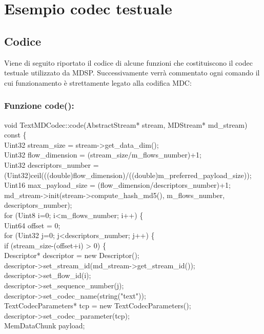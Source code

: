 \chapter{Esempio codec testuale}
\section{Codice}
Viene di seguito riportato il codice di alcune funzioni che costituiscono il codec testuale utilizzato da MDSP. Successivamente verr\`a commentato ogni comando il cui funzionamento \`e strettamente legato alla codifica MDC:
\subsection{Funzione code():}

\begin{code}
void TextMDCodec::code(AbstractStream* stream, MDStream* md\_stream) const \{\\
	Uint32 stream\_size = stream->get\_data\_dim();\\
	Uint32 flow\_dimension = (stream\_size/m\_flows\_number)+1;\\
	Uint32 descriptors\_number = \\(Uint32)ceil(((double)flow\_dimension)/((double)m\_preferred\_payload\_size));\\
	Uint16 max\_payload\_size = (flow\_dimension/descriptors\_number)+1;\\
	md\_stream->init(stream->compute\_hash\_md5(), m\_flows\_number, descriptors\_number);\\
	for (Uint8 i=0; i<m\_flows\_number; i++) \{\\
		Uint64 offset = 0;\\
		for (Uint32 j=0; j<descriptors\_number; j++) \{\\
			if (stream\_size-(offset+i) > 0) \{\\
				Descriptor* descriptor = new Descriptor();\\
				descriptor->set\_stream\_id(md\_stream->get\_stream\_id());\\
				descriptor->set\_flow\_id(i);\\
				descriptor->set\_sequence\_number(j);\\
				descriptor->set\_codec\_name(string("text"));\\
				TextCodecParameters* tcp = new TextCodecParameters();\\
				descriptor->set\_codec\_parameter(tcp);\\
				MemDataChunk payload;\\

\end{code}
